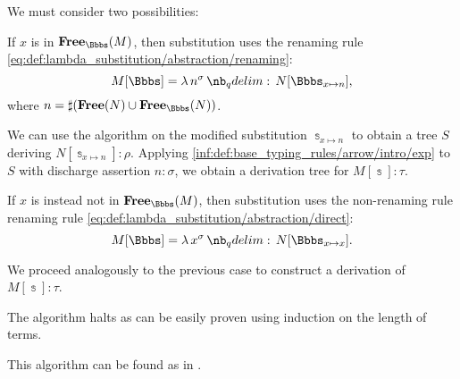 \begin{algorithm}
\begin{thmenum}
    We must consider two possibilities:
    \begin{thmenum}
       If \( x \) is in \( \op*{Free}_\Bbbs(M) \), then substitution uses the renaming rule \eqref{eq:def:lambda_substitution/abstraction/renaming}:
      \begin{equation*}
        M[\Bbbs] = \qabs {n^\sigma} N[\Bbbs_{x \mapsto n}],
      \end{equation*}
      where \( n = \sharp(\op*{Free}(N) \cup \op*{Free}_\Bbbs(N)) \).

      We can use the algorithm on the modified substitution \( \Bbbs_{x \mapsto n} \) to obtain a tree \( S \) deriving \( N[\Bbbs_{x \mapsto n}]: \rho \). Applying \ref{inf:def:base_typing_rules/arrow/intro/exp} to \( S \) with discharge assertion \( n: \sigma \), we obtain a derivation tree for \( M[\Bbbs]: \tau \).

       If \( x \) is instead not in \( \op*{Free}_\Bbbs(M) \), then substitution uses the non-renaming rule renaming rule \eqref{eq:def:lambda_substitution/abstraction/direct}:
      \begin{equation*}
        M[\Bbbs] = \qabs {x^\sigma} N[\Bbbs_{x \mapsto x}].
      \end{equation*}

      We proceed analogously to the previous case to construct a derivation of \( M[\Bbbs]: \tau \).
    \end{thmenum}
  \end{thmenum}
\end{algorithm}
\begin{defproof}
  The algorithm halts as can be easily proven using induction on the length of terms.
\end{defproof}
\begin{comments}
  \item This algorithm can be found as  in \cite{notebook:code}.
\end{comments}

